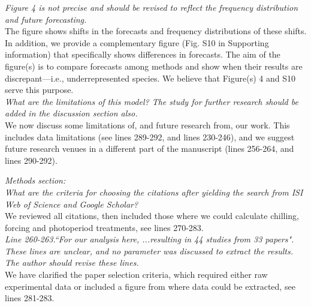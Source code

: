 \documentclass[11pt]{article}
\begin{document}
\emph{Figure 4 is not precise and should be revised to reflect the frequency distribution and future forecasting.}\\
The figure shows shifts in the forecasts and frequency distributions of these shifts. In addition, we provide a complementary figure (Fig. S10 in Supporting information) that specifically shows differences in forecasts. The aim of the figure(s) is to compare forecasts among methods and show when their results are discrepant---i.e., underrepresented species. We believe that Figure(s) 4 and S10 serve this purpose.\\


\emph{What are the limitations of this model? The study for further research should be added in the discussion section also.}\\
We now discuss some limitations of, and future research from, our work. This includes data limitations (see lines 289-292, and lines 230-246), and we suggest future research venues in a different part of the manuscript (lines 256-264, and lines 290-292).

\emph{Methods section:}\\
\emph{What are the criteria for choosing the citations after yielding the search from ISI Web of Science and Google Scholar?}\\
We reviewed all citations, then included those where we could calculate chilling, forcing and photoperiod treatments, see lines 270-283. \\

\emph{Line 260-263.``For our analysis here, ...resulting in 44 studies from 33 papers". These lines are unclear, and no parameter was discussed to extract the results. The author should revise these lines.}\\
We have clarified the paper selection criteria, which required either raw experimental data or included a figure from where data could be extracted, see lines 281-283. 
\end{document}
